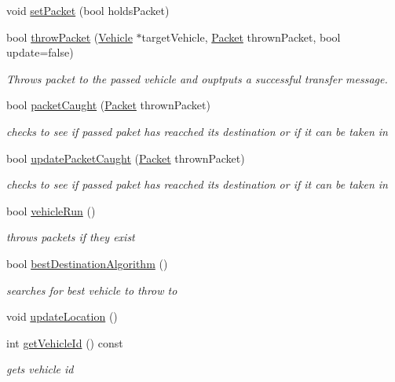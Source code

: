 \begin{DoxyCompactItemize}
void \hyperlink{class_vehicle_acd18d9e37e9d54c03cf0b6b6a95dfae1}{set\+Packet} (bool holds\+Packet)
\item 
bool \hyperlink{class_vehicle_a8858df03bffec647e3c72a58530a600b}{throw\+Packet} (\hyperlink{class_vehicle}{Vehicle} $\ast$target\+Vehicle, \hyperlink{struct_packet}{Packet} thrown\+Packet, bool update=false)
\begin{DoxyCompactList}\small\item\em Throws packet to the passed vehicle and ouptputs a successful transfer message. \end{DoxyCompactList}\item 
bool \hyperlink{class_vehicle_ab1af997092319d762ccbeda3bf6853c0}{packet\+Caught} (\hyperlink{struct_packet}{Packet} thrown\+Packet)
\begin{DoxyCompactList}\small\item\em checks to see if passed paket has reacched its destination or if it can be taken in \end{DoxyCompactList}\item 
bool \hyperlink{class_vehicle_a66ae172bfcd9d1f691bc9a32e4e7cc71}{update\+Packet\+Caught} (\hyperlink{struct_packet}{Packet} thrown\+Packet)
\begin{DoxyCompactList}\small\item\em checks to see if passed paket has reacched its destination or if it can be taken in \end{DoxyCompactList}\item 
bool \hyperlink{class_vehicle_ab49fda8bf7a04ff5321b377c55d7babd}{vehicle\+Run} ()
\begin{DoxyCompactList}\small\item\em throws packets if they exist \end{DoxyCompactList}\item 
bool \hyperlink{class_vehicle_a63f852ddbc0ff5be56cfc830f7482b8f}{best\+Destination\+Algorithm} ()
\begin{DoxyCompactList}\small\item\em searches for best vehicle to throw to \end{DoxyCompactList}\item 
void \hyperlink{class_vehicle_a6c88cbaee4264ac164f81136994a623e}{update\+Location} ()
\item 
int \hyperlink{class_vehicle_a39f3a50c413161b345f0230529994ccb}{get\+Vehicle\+Id} () const
\begin{DoxyCompactList}\small\item\em gets vehicle id \end{DoxyCompactList}\end{DoxyCompactItemize}
